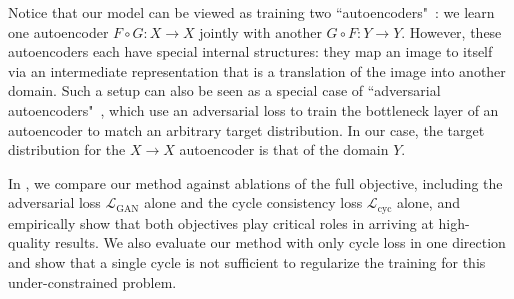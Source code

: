 Notice that our model can be viewed as training two ``autoencoders"~\cite{hinton2006reducing}: we learn one autoencoder $F \circ G: X \rightarrow X$ jointly with another $G \circ F: Y \rightarrow Y$. However, these autoencoders each have special internal structures: they map an image to itself via an intermediate representation that is a translation of the image into another domain. Such a setup can also be seen as a special case of ``adversarial autoencoders"~\cite{makhzani2015adversarial}, which use an adversarial loss to train the bottleneck layer of an autoencoder to match an arbitrary target distribution. In our case, the target distribution for the $X \rightarrow X$ autoencoder is that of the domain $Y$.


In , we compare our method against ablations of the full objective, including the adversarial loss $\mathcal{L}_{\text{GAN}}$ alone and the cycle consistency loss $\mathcal{L}_{\text{cyc}}$ alone, and empirically show that both objectives play critical roles in arriving at high-quality results. We also evaluate our method with only cycle loss in one direction and show that a single cycle is not sufficient to regularize the training for this under-constrained problem.
